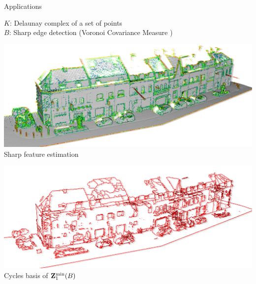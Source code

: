 \begin{frame}{Applications}
	\scriptsize

	$K$: Delaunay complex of a set of points\\
	$B$: Sharp edge detection (Voronoi Covariance Measure \cite{merigot_VoronoiBasedCurvatureFeature_2011})\\
	
	\vspace{0.5cm}
	\pause
	\begin{minipage}{0.5\linewidth}
		\centering
		\includegraphics[width=\linewidth]{applications/lille_points}\\
		Sharp feature estimation
	\end{minipage}%
	\hfill%
	\pause%
	\begin{minipage}{0.5\linewidth}
		\centering
		\includegraphics[width=\linewidth]{applications/lille_cycles}\\
		Cycles basis of $\mathbf{Z}^{\min}_1(B)$
	\end{minipage}
	

\end{frame}
